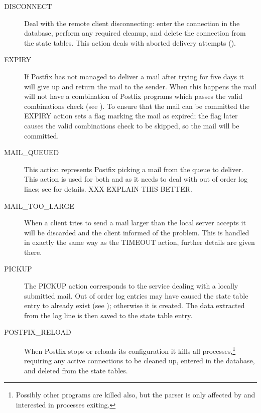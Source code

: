 \begin{description}
    \item [DISCONNECT] Deal with the remote client disconnecting: enter the
        connection in the database, perform any required cleanup, and
        delete the connection from the state tables.  This action deals
        with aborted delivery attempts
        ().

    \item [EXPIRY] If Postfix has not managed to deliver a mail after
        trying for five days it will give up and return the mail to the
        sender.  When this happens the mail will not have a combination of
        Postfix programs which passes the valid combinations check (see
        ).  To ensure that the mail can
        be committed the EXPIRY action sets a flag marking the mail as
        expired; the flag later causes the valid combinations check to be
        skipped, so the mail will be committed.

    \item [MAIL\_QUEUED] This action represents Postfix picking a mail from
        the queue to deliver. This action is used for both 
        and  as it needs to deal with out of order log
        lines; see  for details.  XXX
        EXPLAIN THIS BETTER\@.

    \item [MAIL\_TOO\_LARGE] When a client tries to send a mail larger than
        the local server accepts it will be discarded and the client
        informed of the problem.  This is handled in exactly the same way
        as the TIMEOUT action, further details are given there.

    \item [PICKUP] The PICKUP action corresponds to the 
        service dealing with a locally submitted mail.  Out of order log
        entries may have caused the state table entry to already exist (see
        ); otherwise it is
        created.  The data extracted from the log line is then saved to the
        state table entry.

    \item [POSTFIX\_RELOAD] When Postfix stops or reloads its configuration
        it kills all  processes,\footnote{Possibly other
        programs are killed also, but the parser is only affected by and
        interested in  processes exiting.} requiring any
        active connections to be cleaned up, entered in the database, and
        deleted from the state tables.


\end{description}
